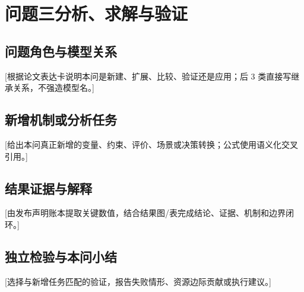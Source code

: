 \section{问题三分析、求解与验证}
\subsection{问题角色与模型关系}
[根据论文表达卡说明本问是新建、扩展、比较、验证还是应用；后 3 类直接写继承关系，不强造模型名。]
\subsection{新增机制或分析任务}
[给出本问真正新增的变量、约束、评价、场景或决策转换；公式使用语义化交叉引用。]
\subsection{结果证据与解释}
[由发布声明账本提取关键数值，结合结果图/表完成结论、证据、机制和边界闭环。]
\subsection{独立检验与本问小结}
[选择与新增任务匹配的验证，报告失败情形、资源边际贡献或执行建议。]
